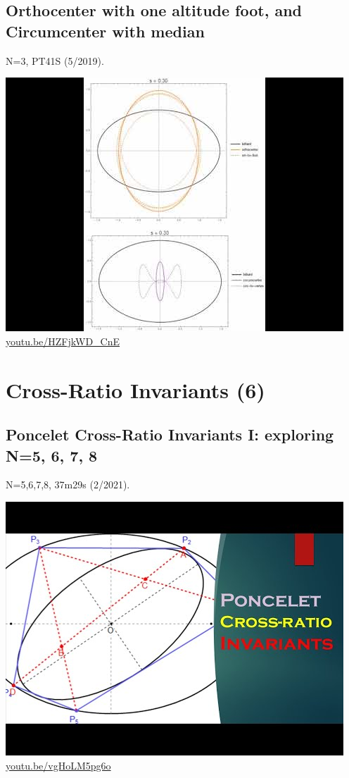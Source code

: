 \documentclass[12pt]{amsart}
\begin{document}
\subsection{Orthocenter with one altitude foot, and Circumcenter with median}
\label{vid:HZFjkWD_CnE}
\noindent N=3, PT41S (5/2019). 
\begin{center}\includegraphics[width=.5\textwidth]{pics/HZFjkWD_CnE.jpg} \\ 
\href{https://youtu.be/HZFjkWD_CnE}{\url{youtu.be/HZFjkWD\_CnE}}\end{center}
% 


\section{Cross-Ratio Invariants (6)}

\subsection{Poncelet Cross-Ratio Invariants I: exploring N=5, 6, 7, 8}
\label{vid:vgHoLM5pg6o}
\noindent N=5,6,7,8, 37m29s (2/2021). 
\begin{center}\includegraphics[width=.5\textwidth]{pics/vgHoLM5pg6o.jpg} \\ 
\href{https://youtu.be/vgHoLM5pg6o}{\url{youtu.be/vgHoLM5pg6o}}\end{center}
% 
\end{document}

